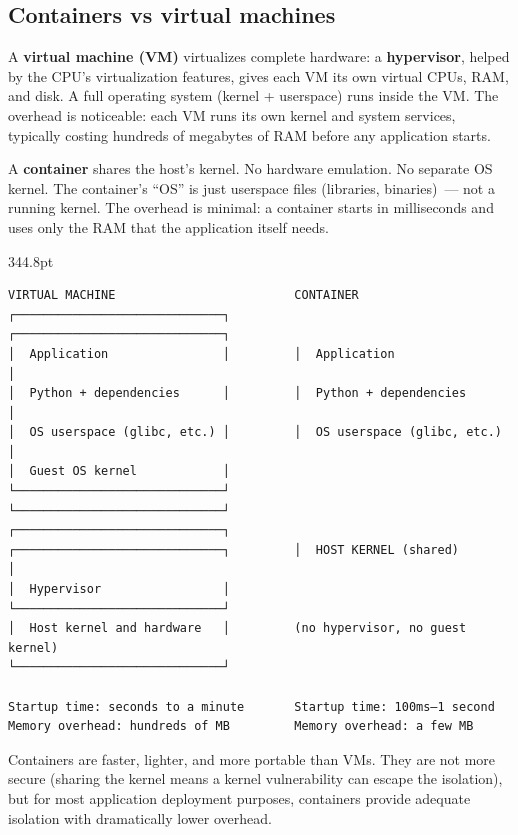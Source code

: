 \subsection*{Containers vs virtual machines}\label{18-containerization:containers-vs-virtual-machines}

A \textbf{virtual machine (VM)} virtualizes complete hardware: a \textbf{hypervisor}, helped by the CPU's virtualization features, gives each VM its own virtual CPUs, RAM, and disk. A full operating system (kernel + userspace) runs inside the VM. The overhead is noticeable: each VM runs its own kernel and system services, typically costing hundreds of megabytes of RAM before any application starts.

A \textbf{container} shares the host's kernel. No hardware emulation. No separate OS kernel. The container's ``OS'' is just userspace files (libraries, binaries)~--- not a running kernel. The overhead is minimal: a container starts in milliseconds and uses only the RAM that the application itself needs.

\begin{diagrambox}[short]{344.8pt}
\begin{Verbatim}[fontsize=\fontsize{9.0}{8.55}\selectfont]
VIRTUAL MACHINE                         CONTAINER
┌─────────────────────────────┐         ┌─────────────────────────────┐
│  Application                │         │  Application                │
│  Python + dependencies      │         │  Python + dependencies      │
│  OS userspace (glibc, etc.) │         │  OS userspace (glibc, etc.) │
│  Guest OS kernel            │         └─────────────────────────────┘
└─────────────────────────────┘         ┌─────────────────────────────┐
┌─────────────────────────────┐         │  HOST KERNEL (shared)       │
│  Hypervisor                 │         └─────────────────────────────┘
│  Host kernel and hardware   │         (no hypervisor, no guest kernel)
└─────────────────────────────┘

Startup time: seconds to a minute       Startup time: 100ms–1 second
Memory overhead: hundreds of MB         Memory overhead: a few MB
\end{Verbatim}
\end{diagrambox}

\noindent{}Containers are faster, lighter, and more portable than VMs. They are not more secure (sharing the kernel means a kernel vulnerability can escape the isolation), but for most application deployment purposes, containers provide adequate isolation with dramatically lower overhead.

